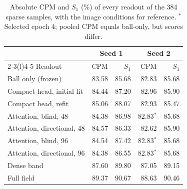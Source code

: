 \begin{table}[t]
\centering
\small
\setlength{\tabcolsep}{4pt}
\caption{Absolute CPM and $S_1$ (\%) of every readout of the 384 sparse samples, with the image conditions for reference. $^\ast$Selected epoch 4; pooled CPM equals ball-only, but scores differ.}
\label{tab:sparse}
\begin{tabular}{@{}lrrrr@{}}
\toprule
 & \multicolumn{2}{c}{Seed 1} & \multicolumn{2}{c}{Seed 2} \\
\cmidrule(lr){2-3}\cmidrule(l){4-5}
Readout & CPM & $S_1$ & CPM & $S_1$ \\
\midrule
Ball only (frozen) & 83.58 & 85.68 & 82.83 & 85.68 \\
Compact head, initial fit & 84.44 & 87.20 & 82.96 & 85.90 \\
Compact head, refit & 85.06 & 88.07 & 82.93 & 85.47 \\
Attention, blind, 48 & 84.38 & 86.98 & 82.83$^\ast$ & 85.68 \\
Attention, directional, 48 & 84.57 & 86.33 & 82.62 & 85.90 \\
Attention, blind, 96 & 84.54 & 87.42 & 82.83$^\ast$ & 85.68 \\
Attention, directional, 96 & 84.38 & 86.55 & 82.83$^\ast$ & 85.68 \\
\midrule
Dense band & 87.60 & 89.80 & 87.05 & 89.15 \\
Full field & 89.37 & 90.67 & 88.63 & 90.46 \\
\bottomrule
\end{tabular}
\end{table}
